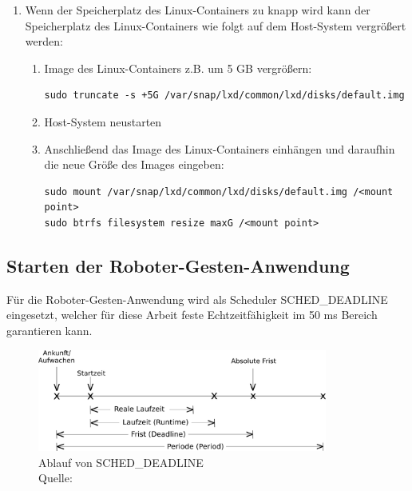 \begin{enumerate}[label*=\arabic*.]
        \item Wenn der Speicherplatz des Linux-Containers zu knapp wird kann der Speicherplatz des Linux-Containers wie folgt auf dem Host-System vergrößert werden:
            \begin{enumerate}[label*=\arabic*.]
                \item Image des Linux-Containers z.B. um 5 GB vergrößern:
                    \begin{lstlisting}[style=bash]
sudo truncate -s +5G /var/snap/lxd/common/lxd/disks/default.img
                    \end{lstlisting}

                \item Host-System neustarten

                \item Anschließend das Image des Linux-Containers einhängen und daraufhin die neue Größe des Images eingeben:
                    \begin{lstlisting}[style=bash]
sudo mount /var/snap/lxd/common/lxd/disks/default.img /<mount point>
sudo btrfs filesystem resize maxG /<mount point>
                    \end{lstlisting}
            \end{enumerate}
\end{enumerate}


\subsection{Starten der Roboter-Gesten-Anwendung}
Für die Roboter-Gesten-Anwendung wird als Scheduler SCHED\_DEADLINE eingesetzt, welcher für diese Arbeit feste Echtzeitfähigkeit im 50 ms Bereich garantieren kann.

\begin{figure}[htb]
	\centering
	\includegraphics[width=0.85\textwidth]{images/anhang/sched_deadline}
	\caption[Ablauf von SCHED\_DEADLINE]{Ablauf von SCHED\_DEADLINE \\Quelle: \cite{man_sched7_nodate}}
	\label{fig:sched_deadline}
\end{figure}
\FloatBarrier

